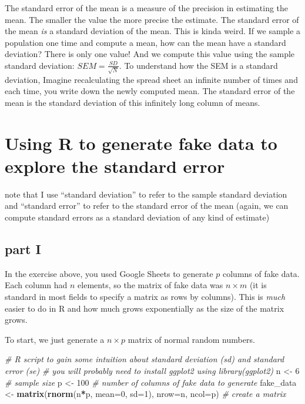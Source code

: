 \documentclass[]{book}
\newenvironment{Shaded}{\begin{snugshade}}{\end{snugshade}}
\newcommand{\KeywordTok}[1]{\textcolor[rgb]{0.13,0.29,0.53}{\textbf{#1}}}
\newcommand{\DataTypeTok}[1]{\textcolor[rgb]{0.13,0.29,0.53}{#1}}
\newcommand{\DecValTok}[1]{\textcolor[rgb]{0.00,0.00,0.81}{#1}}
\newcommand{\StringTok}[1]{\textcolor[rgb]{0.31,0.60,0.02}{#1}}
\newcommand{\CommentTok}[1]{\textcolor[rgb]{0.56,0.35,0.01}{\textit{#1}}}
\newcommand{\OperatorTok}[1]{\textcolor[rgb]{0.81,0.36,0.00}{\textbf{#1}}}
\newcommand{\NormalTok}[1]{#1}
\begin{document}
The standard error of the mean is a measure of the precision in
estimating the mean. The smaller the value the more precise the
estimate. The standard error of the mean \emph{is} a standard deviation
of the mean. This is kinda weird. If we sample a population one time and
compute a mean, how can the mean have a standard deviation? There is
only one value! And we compute this value using the sample standard
deviation: \(SEM = \frac{SD}{\sqrt{N}}\). To understand how the SEM is a
standard deviation, Imagine recalculating the spread sheet an infinite
number of times and each time, you write down the newly computed mean.
The standard error of the mean is the standard deviation of this
infinitely long column of means.

\section{Using R to generate fake data to explore the standard
error}\label{using-r-to-generate-fake-data-to-explore-the-standard-error}

note that I use ``standard deviation'' to refer to the sample standard
deviation and ``standard error'' to refer to the standard error of the
mean (again, we can compute standard errors as a standard deviation of
any kind of estimate)

\subsection{part I}\label{part-i}

In the exercise above, you used Google Sheets to generate \(p\) columns
of fake data. Each column had \(n\) elements, so the matrix of fake data
was \(n \times m\) (it is standard in most fields to specify a matrix as
rows by columns). This is \emph{much} easier to do in R and how much
grows exponentially as the size of the matrix grows.

To start, we just generate a \(n \times p\) matrix of normal random
numbers.

\begin{Shaded}
\begin{Highlighting}[]
\CommentTok{# R script to gain some intuition about standard deviation (sd) and standard error (se)}
\CommentTok{# you will probably need to install ggplot2 using library(ggplot2) }
\NormalTok{n <-}\StringTok{ }\DecValTok{6} \CommentTok{# sample size}
\NormalTok{p <-}\StringTok{ }\DecValTok{100} \CommentTok{# number of columns of fake data to generate}
\NormalTok{fake_data <-}\StringTok{ }\KeywordTok{matrix}\NormalTok{(}\KeywordTok{rnorm}\NormalTok{(n}\OperatorTok{*}\NormalTok{p, }\DataTypeTok{mean=}\DecValTok{0}\NormalTok{, }\DataTypeTok{sd=}\DecValTok{1}\NormalTok{), }\DataTypeTok{nrow=}\NormalTok{n, }\DataTypeTok{ncol=}\NormalTok{p) }\CommentTok{# create a matrix}
\end{Highlighting}
\end{Shaded}
\end{document}
